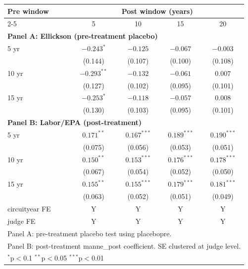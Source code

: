 \begin{tabular}{lcccc}
\toprule
\multirow{2}{*}{Pre window} & \multicolumn{4}{c}{Post window (years)} \\
\cmidrule(r){2-5}
 & 5 & 10 & 15 & 20 \\
\midrule
\multicolumn{5}{l}{\textbf{Panel A: Ellickson (pre-treatment placebo)}} \\
5 yr & \(-0.243^{*}\) & \(-0.125\) & \(-0.067\) & \(-0.003\) \\
 & (0.144) & (0.107) & (0.100) & (0.108) \\
10 yr & \(-0.293^{**}\) & \(-0.132\) & \(-0.061\) & \(0.007\) \\
 & (0.127) & (0.102) & (0.095) & (0.101) \\
15 yr & \(-0.253^{*}\) & \(-0.118\) & \(-0.057\) & \(0.008\) \\
 & (0.130) & (0.103) & (0.095) & (0.101) \\
\multicolumn{5}{l}{\textbf{Panel B: Labor/EPA (post-treatment)}} \\
5 yr & \(0.171^{**}\) & \(0.167^{***}\) & \(0.189^{***}\) & \(0.190^{***}\) \\
 & (0.075) & (0.056) & (0.053) & (0.051) \\
10 yr & \(0.150^{**}\) & \(0.153^{***}\) & \(0.176^{***}\) & \(0.178^{***}\) \\
 & (0.067) & (0.054) & (0.052) & (0.050) \\
15 yr & \(0.155^{**}\) & \(0.155^{***}\) & \(0.179^{***}\) & \(0.181^{***}\) \\
 & (0.063) & (0.052) & (0.051) & (0.049) \\
\midrule
circuityear FE & Y & Y & Y & Y \\
judge FE & Y & Y & Y & Y \\
\bottomrule
\multicolumn{5}{l}{\footnotesize Panel A: pre-treatment placebo test using placebopre.} \\
\multicolumn{5}{l}{\footnotesize Panel B: post-treatment manne\_post coefficient. SE clustered at judge level.} \\
\multicolumn{5}{l}{\footnotesize \(^{*}\)p\(<\)0.1 \(^{**}\)p\(<\)0.05 \(^{***}\)p\(<\)0.01} \\
\end{tabular}
